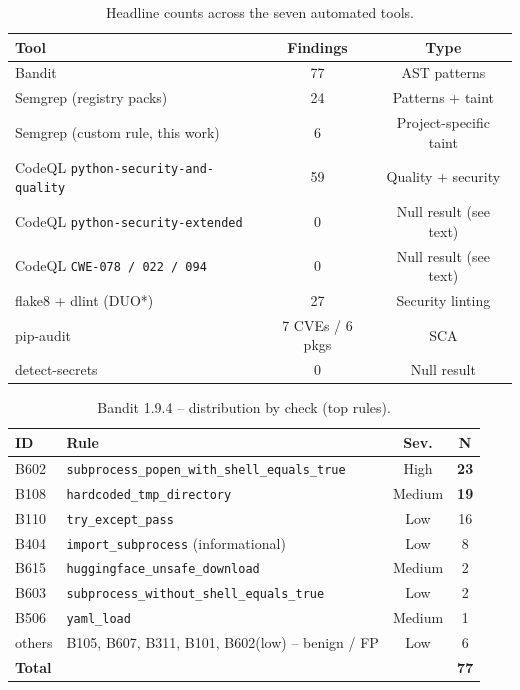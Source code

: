 \documentclass[conference]{IEEEtran}
\begin{document}
\begin{table}[t]
\caption{Headline counts across the seven automated tools.}
\label{tab:tool-totals}
\centering\renewcommand{\arraystretch}{1.15}
\begin{tabularx}{\columnwidth}{Xcc}
\toprule
\textbf{Tool} & \textbf{Findings} & \textbf{Type} \\
\midrule
Bandit                                  & 77 & AST patterns \\
Semgrep (registry packs)                & 24 & Patterns + taint \\
Semgrep (custom rule, this work)        & 6  & Project-specific taint \\
CodeQL \texttt{python-security-and-quality} & 59 & Quality + security \\
CodeQL \texttt{python-security-extended}    & 0  & Null result (see text) \\
CodeQL \texttt{CWE-078 / 022 / 094}          & 0  & Null result (see text) \\
flake8 + dlint (DUO*)                   & 27 & Security linting \\
pip-audit                               & 7 CVEs / 6 pkgs & SCA \\
detect-secrets                          & 0 & Null result \\
\bottomrule
\end{tabularx}
\end{table}

\begin{table}[t]
\caption{Bandit 1.9.4 -- distribution by check (top rules).}
\label{tab:bandit-summary}
\centering\renewcommand{\arraystretch}{1.15}
\begin{tabularx}{\columnwidth}{lXcc}
\toprule
\textbf{ID} & \textbf{Rule} & \textbf{Sev.} & \textbf{N} \\
\midrule
B602 & \texttt{subprocess\_popen\_with\_shell\_equals\_true} & High   & \textbf{23} \\
B108 & \texttt{hardcoded\_tmp\_directory}                    & Medium & \textbf{19} \\
B110 & \texttt{try\_except\_pass}                            & Low    & 16 \\
B404 & \texttt{import\_subprocess} (informational)           & Low    & 8  \\
B615 & \texttt{huggingface\_unsafe\_download}                & Medium & 2  \\
B603 & \texttt{subprocess\_without\_shell\_equals\_true}     & Low    & 2  \\
B506 & \texttt{yaml\_load}                                   & Medium & 1  \\
others & B105, B607, B311, B101, B602(low) -- benign / FP   & Low    & 6  \\
\midrule
\multicolumn{2}{l}{\textbf{Total}} & & \textbf{77} \\
\bottomrule
\end{tabularx}
\end{table}
\end{document}
